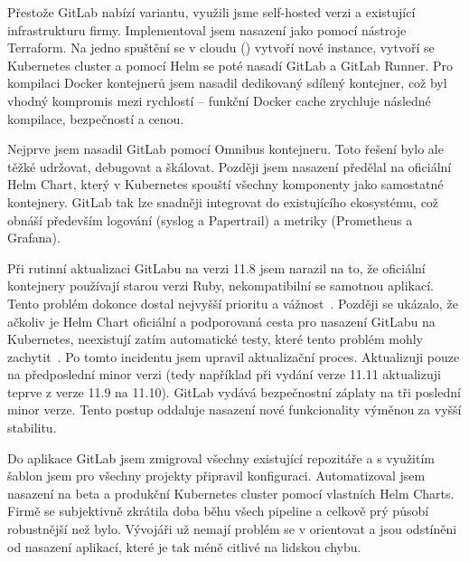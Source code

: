     Přestože GitLab nabízí  variantu, využili jsme self-hosted verzi a existující infrastrukturu firmy. Implementoval jsem nasazení jako  pomocí nástroje Terraform. Na jedno spuštění se v cloudu () vytvoří nové instance, vytvoří se Kubernetes cluster a pomocí Helm se poté nasadí GitLab a GitLab Runner. Pro kompilaci Docker kontejnerů jsem nasadil dedikovaný sdílený  kontejner, což byl vhodný kompromis mezi rychlostí -- funkční Docker cache zrychluje následné kompilace, bezpečností a cenou.

    Nejprve jsem nasadil GitLab pomocí Omnibus kontejneru. Toto řešení bylo ale těžké udržovat, debugovat a škálovat. Později jsem nasazení předělal na oficiální Helm Chart, který v Kubernetes spouští všechny komponenty jako samostatné kontejnery. GitLab tak lze snadněji integrovat do existujícího ekosystému, což obnáší především logování (syslog a Papertrail) a metriky (Prometheus a Grafana).

    Při rutinní aktualizaci GitLabu na verzi 11.8 jsem narazil na to, že oficiální kontejnery používají starou verzi Ruby, nekompatibilní se samotnou aplikací. Tento problém dokonce dostal nejvyšší prioritu a vážnost~\cite{gitlab-issue-chart}. Později se ukázalo, že ačkoliv je Helm Chart oficiální a podporovaná cesta pro nasazení GitLabu na Kubernetes, neexistují zatím automatické testy, které tento problém mohly zachytit~\cite{gitlab-issue-qa}. Po tomto incidentu jsem upravil aktualizační proces. Aktualizuji pouze na předposlední minor verzi (tedy například při vydání verze 11.11 aktualizuji teprve z verze 11.9 na 11.10). GitLab vydává bezpečnostní záplaty na tři poslední minor verze. Tento postup oddaluje nasazení nové funkcionality výměnou za vyšší stabilitu.

    Do aplikace GitLab jsem zmigroval všechny existující repozitáře a s využitím šablon jsem pro všechny projekty připravil \CI konfiguraci. Automatizoval jsem nasazení na beta a produkční Kubernetes cluster pomocí vlastních Helm Charts. Firmě se subjektivně zkrátila doba běhu všech pipeline a celkově prý působí \CI robustnější než bylo. Vývojáři už nemají problém se v \CI orientovat a jsou odstíněni od nasazení aplikací, které je tak méně citlivé na lidskou chybu.
